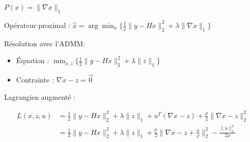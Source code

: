 \begin{frame}{$P(x) = \lVert \nabla x \rVert_{1}$}

Opérateur proximal : $\hat{x} = \arg \min_{x} \{ \frac{1}{2} \lVert y - Hx \rVert_{2}^{2} + \lambda \lVert \nabla x \rVert_{1} \}$ \\

\vspace{5mm}

Résolution avec l'ADMM:
\begin{itemize}
    \item Équation : $\min_{x, z} \{ \frac{1}{2} \lVert y - Hx \rVert_{2}^{2} + \lambda \lVert z \rVert_{1} \}$
    \item Contrainte : $\nabla x - z = \overrightarrow{0}$
\end{itemize}

\vspace{5mm}

Lagrangien augmenté :

\begin{align*}
L(x, z, u) 
&= \frac{1}{2} \lVert y - Hx \rVert_{2}^{2} + \lambda \lVert z \rVert_{1} +
u^{T}(\nabla x-z) + \frac{\rho}{2} \lVert \nabla x-z \rVert_{2}^{2} \\
&= \frac{1}{2} \lVert y - Hx \rVert_{2}^{2} + \lambda \lVert z \rVert_{1} +
\frac{\rho}{2} \lVert \nabla x-z+\frac{u}{\rho} \rVert_{2}^{2} - \frac{\lVert u \rVert_{2}^{2}}{2\rho}    
\end{align*}

\end{frame}

